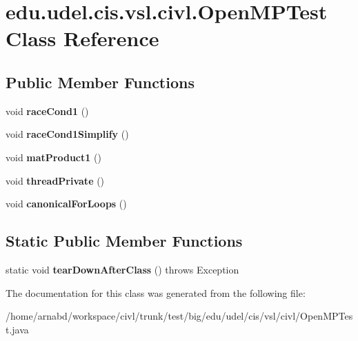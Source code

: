 \hypertarget{classedu_1_1udel_1_1cis_1_1vsl_1_1civl_1_1OpenMPTest}{}\section{edu.\+udel.\+cis.\+vsl.\+civl.\+Open\+M\+P\+Test Class Reference}
\label{classedu_1_1udel_1_1cis_1_1vsl_1_1civl_1_1OpenMPTest}
\subsection*{Public Member Functions}
\begin{DoxyCompactItemize}
\item 
\hypertarget{classedu_1_1udel_1_1cis_1_1vsl_1_1civl_1_1OpenMPTest_a9e82c387a59f219552310f93adb54103}{}void {\bfseries race\+Cond1} ()\label{classedu_1_1udel_1_1cis_1_1vsl_1_1civl_1_1OpenMPTest_a9e82c387a59f219552310f93adb54103}

\item 
\hypertarget{classedu_1_1udel_1_1cis_1_1vsl_1_1civl_1_1OpenMPTest_ab49a6bcdfe32b1fe26e53e15971bbfaa}{}void {\bfseries race\+Cond1\+Simplify} ()\label{classedu_1_1udel_1_1cis_1_1vsl_1_1civl_1_1OpenMPTest_ab49a6bcdfe32b1fe26e53e15971bbfaa}

\item 
\hypertarget{classedu_1_1udel_1_1cis_1_1vsl_1_1civl_1_1OpenMPTest_a2d1c50cc7769967e61658ca26464af14}{}void {\bfseries mat\+Product1} ()\label{classedu_1_1udel_1_1cis_1_1vsl_1_1civl_1_1OpenMPTest_a2d1c50cc7769967e61658ca26464af14}

\item 
\hypertarget{classedu_1_1udel_1_1cis_1_1vsl_1_1civl_1_1OpenMPTest_a12a2fd3244b61cfcd1511b54772dd467}{}void {\bfseries thread\+Private} ()\label{classedu_1_1udel_1_1cis_1_1vsl_1_1civl_1_1OpenMPTest_a12a2fd3244b61cfcd1511b54772dd467}

\item 
\hypertarget{classedu_1_1udel_1_1cis_1_1vsl_1_1civl_1_1OpenMPTest_a322c1893693b2817659bac329d1ebaaf}{}void {\bfseries canonical\+For\+Loops} ()\label{classedu_1_1udel_1_1cis_1_1vsl_1_1civl_1_1OpenMPTest_a322c1893693b2817659bac329d1ebaaf}

\end{DoxyCompactItemize}
\subsection*{Static Public Member Functions}
\begin{DoxyCompactItemize}
\item 
\hypertarget{classedu_1_1udel_1_1cis_1_1vsl_1_1civl_1_1OpenMPTest_a04752d4136ced9d453b929d06be263b2}{}static void {\bfseries tear\+Down\+After\+Class} ()  throws Exception \label{classedu_1_1udel_1_1cis_1_1vsl_1_1civl_1_1OpenMPTest_a04752d4136ced9d453b929d06be263b2}

\end{DoxyCompactItemize}


The documentation for this class was generated from the following file\+:\begin{DoxyCompactItemize}
\item 
/home/arnabd/workspace/civl/trunk/test/big/edu/udel/cis/vsl/civl/Open\+M\+P\+Test.\+java\end{DoxyCompactItemize}
